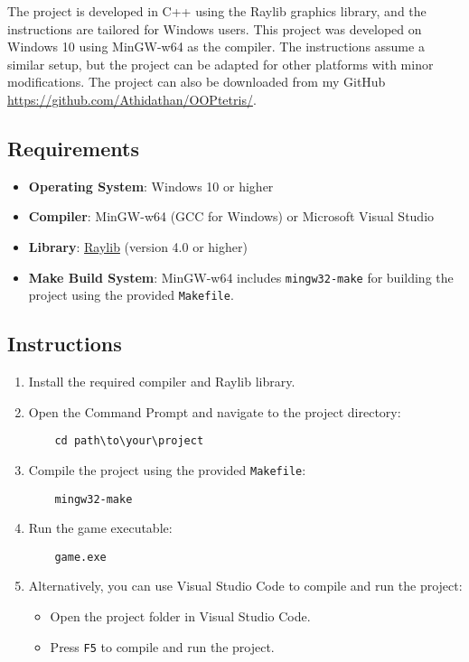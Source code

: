 \documentclass{article}
\begin{document}
The project is developed in C++ using the Raylib graphics library, and the instructions are tailored for Windows users. This project was developed on Windows 10 using MinGW-w64 as the compiler. The instructions assume a similar setup, but the project can be adapted for other platforms with minor modifications. The project can also be downloaded from my GitHub \url{https://github.com/Athidathan/OOPtetris/}.

\subsection{Requirements}

\begin{itemize}
    \item \textbf{Operating System}: Windows 10 or higher
    \item \textbf{Compiler}: MinGW-w64 (GCC for Windows) or Microsoft Visual Studio
    \item \textbf{Library}: \href{https://www.raylib.com/}{Raylib} (version 4.0 or higher)
    \item \textbf{Make Build System}: MinGW-w64 includes \texttt{mingw32-make} for building the project using the provided \texttt{Makefile}.
\end{itemize}

\subsection{Instructions}

\begin{enumerate}
    \item Install the required compiler and Raylib library.
    \item Open the Command Prompt and navigate to the project directory:
    \begin{lstlisting}
    cd path\to\your\project
    \end{lstlisting}
    \item Compile the project using the provided \texttt{Makefile}:
    \begin{lstlisting}
    mingw32-make
    \end{lstlisting}
    \item Run the game executable:
    \begin{lstlisting}
    game.exe
    \end{lstlisting}
    \item Alternatively, you can use Visual Studio Code to compile and run the project:
    \begin{itemize}
        \item Open the project folder in Visual Studio Code.
        \item Press \texttt{F5} to compile and run the project.
    \end{itemize}
\end{enumerate}
\end{document}
